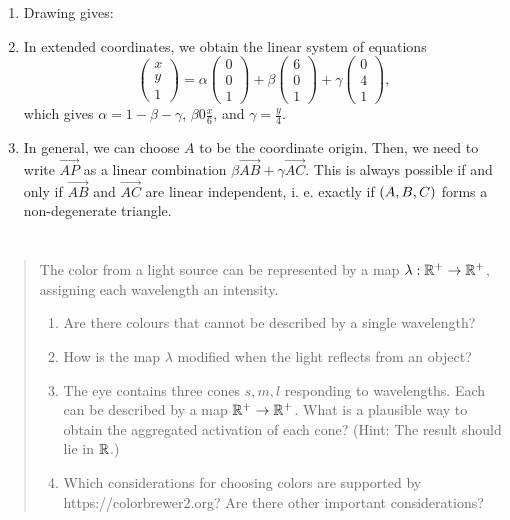 \documentclass[english]{exercise}
\begin{document}
	\begin{enumerate}
		\item Drawing gives:
		\begin{center}
		\end{center}
		\item In extended coordinates, we obtain the linear system of equations
		\[
			\begin{pmatrix}
				x\\
				y\\
				1
			\end{pmatrix} = \alpha\begin{pmatrix}
				0\\
				0\\
				1
			\end{pmatrix} + \beta\begin{pmatrix}
				6\\
				0\\
				1
			\end{pmatrix} + \gamma\begin{pmatrix}
				0\\
				4\\
				1
			\end{pmatrix},
		\]
		which gives \(\alpha = 1 - \beta - \gamma\), \(\beta 0 \frac{x}{6}\), and \(\gamma = \frac{y}{4}\).
		\item In general, we can choose \(A\) to be the coordinate origin.
		Then, we need to write \(\vec{AP}\) as a linear combination \(\beta\vec{AB} + \gamma\vec{AC}\).
		This is always possible if and only if \(\vec{AB}\) and \(\vec{AC}\) are linear independent, i. e. exactly if \(\parentheses*{A, B, C}\) forms a non-degenerate triangle.
	\end{enumerate}


	\section{}

	\begin{quote}
		The color from a light source can be represented by a map \(\lambda: \R^+ \to \R^+\), assigning each wavelength an intensity.
		\begin{enumerate}
			\item Are there colours that cannot be described by a single wavelength?
			\item How is the map \(\lambda\) modified when the light reflects from an object?
			\item The eye contains three cones \(s, m, l\) responding to wavelengths.
			Each can be described by a map \(\R^+ \to \R^+\).
			What is a plausible way to obtain the aggregated activation of each cone?
			(Hint: The result should lie in \(\R\).)
			\item Which considerations for choosing colors are supported by https://colorbrewer2.org?
			Are there other important considerations?
		\end{enumerate}
	\end{quote}
\end{document}
